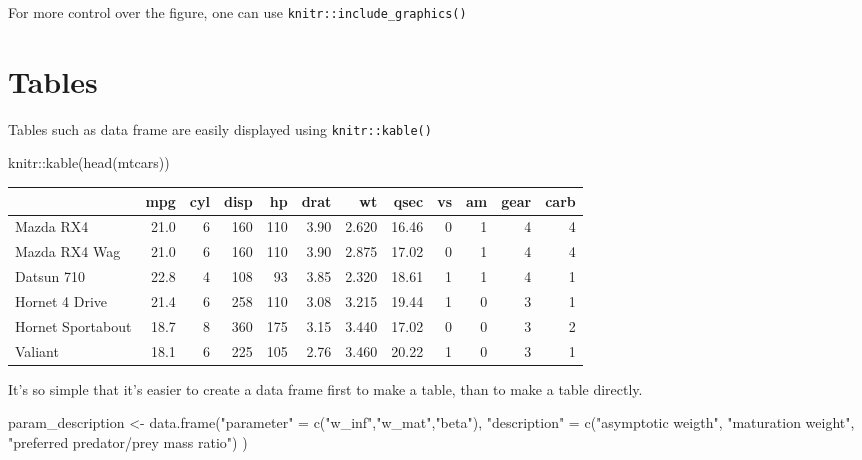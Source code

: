 \documentclass[
  11pt,
]{article}
\newenvironment{Shaded}{\begin{snugshade}}{\end{snugshade}}
\newcommand{\FunctionTok}[1]{\textcolor[rgb]{0.00,0.00,0.00}{#1}}
\newcommand{\NormalTok}[1]{#1}
\newcommand{\OtherTok}[1]{\textcolor[rgb]{0.56,0.35,0.01}{#1}}
\newcommand{\SpecialCharTok}[1]{\textcolor[rgb]{0.00,0.00,0.00}{#1}}
\newcommand{\StringTok}[1]{\textcolor[rgb]{0.31,0.60,0.02}{#1}}
\begin{document}
For more control over the figure, one can use \texttt{knitr::include\_graphics()}

\newpage

\hypertarget{tables}{%
\section{Tables}\label{tables}}

Tables such as data frame are easily displayed using \texttt{knitr::kable()}

\begin{Shaded}
\begin{Highlighting}[]
\NormalTok{knitr}\SpecialCharTok{::}\FunctionTok{kable}\NormalTok{(}\FunctionTok{head}\NormalTok{(mtcars))}
\end{Highlighting}
\end{Shaded}

\begin{tabular}{l|r|r|r|r|r|r|r|r|r|r|r}
\hline
  & mpg & cyl & disp & hp & drat & wt & qsec & vs & am & gear & carb\\
\hline
Mazda RX4 & 21.0 & 6 & 160 & 110 & 3.90 & 2.620 & 16.46 & 0 & 1 & 4 & 4\\
\hline
Mazda RX4 Wag & 21.0 & 6 & 160 & 110 & 3.90 & 2.875 & 17.02 & 0 & 1 & 4 & 4\\
\hline
Datsun 710 & 22.8 & 4 & 108 & 93 & 3.85 & 2.320 & 18.61 & 1 & 1 & 4 & 1\\
\hline
Hornet 4 Drive & 21.4 & 6 & 258 & 110 & 3.08 & 3.215 & 19.44 & 1 & 0 & 3 & 1\\
\hline
Hornet Sportabout & 18.7 & 8 & 360 & 175 & 3.15 & 3.440 & 17.02 & 0 & 0 & 3 & 2\\
\hline
Valiant & 18.1 & 6 & 225 & 105 & 2.76 & 3.460 & 20.22 & 1 & 0 & 3 & 1\\
\hline
\end{tabular}

It's so simple that it's easier to create a data frame first to make a table, than to make a table directly.

\newpage

\begin{Shaded}
\begin{Highlighting}[]
\NormalTok{param\_description }\OtherTok{\textless{}{-}} \FunctionTok{data.frame}\NormalTok{(}\StringTok{"parameter"} \OtherTok{=} \FunctionTok{c}\NormalTok{(}\StringTok{"w\_inf"}\NormalTok{,}\StringTok{"w\_mat"}\NormalTok{,}\StringTok{"beta"}\NormalTok{),}
                               \StringTok{"description"} \OtherTok{=} \FunctionTok{c}\NormalTok{(}\StringTok{"asymptotic weigth"}\NormalTok{,}
                                                 \StringTok{"maturation weight"}\NormalTok{,}
                                                 \StringTok{"preferred predator/prey mass ratio"}\NormalTok{)}
\NormalTok{)}
\end{Highlighting}
\end{Shaded}
\end{document}
